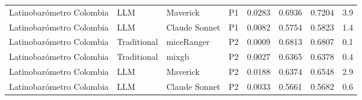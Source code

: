 \documentclass[
  man,
  floatsintext,
  longtable,
  nolmodern,
  notxfonts,
  notimes,
  colorlinks=true,linkcolor=blue,citecolor=blue,urlcolor=blue]{apa7}
\begin{document}
\begin{table}
{\begin{tabular}{lllccccc}
Latinobarómetro Colombia & LLM & Maverick & P1 & 0.0283 & 0.6936 & 0.7204 & 3.9\\
Latinobarómetro Colombia & LLM & Claude Sonnet & P1 & 0.0082 & 0.5754 & 0.5823 & 1.4\\
Latinobarómetro Colombia & Traditional & miceRanger & P2 & 0.0009 & 0.6813 & 0.6807 & 0.1\\
Latinobarómetro Colombia & Traditional & mixgb & P2 & 0.0027 & 0.6365 & 0.6378 & 0.4\\
Latinobarómetro Colombia & LLM & Maverick & P2 & 0.0188 & 0.6374 & 0.6548 & 2.9\\
Latinobarómetro Colombia & LLM & Claude Sonnet & P2 & 0.0033 & 0.5661 & 0.5682 & 0.6\\
\bottomrule
\end{tabular}}
\endgroup{}
\end{table}
\end{document}
